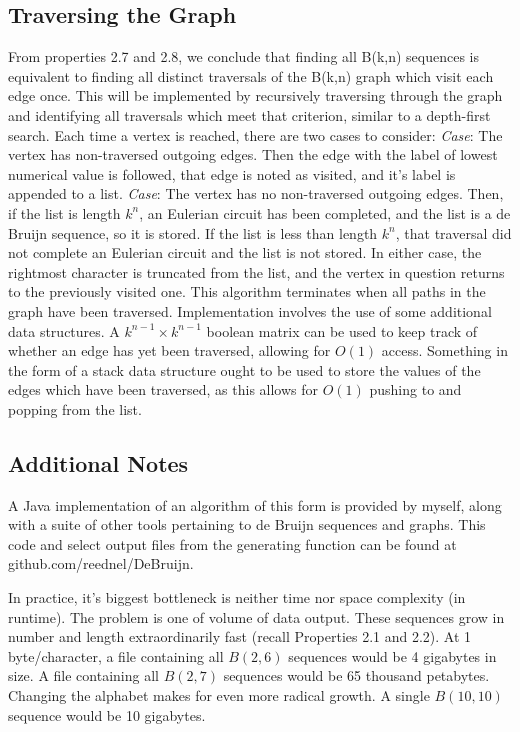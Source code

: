 \documentclass[12pt]{article}
\begin{document}
\subsection{Traversing the Graph}
From properties 2.7 and 2.8, we conclude that finding all B(k,n) sequences is equivalent to finding all distinct traversals of the B(k,n) graph which visit each edge once. This will be implemented by recursively traversing through the graph and identifying all traversals which meet that criterion, similar to a depth-first search. Each time a vertex is reached, there are two cases to consider:\newline
\emph{Case}: The vertex has non-traversed outgoing edges.\newline
Then the edge with the label of lowest numerical value is followed, that edge is noted as visited, and it's label is appended to a list.\newline
\emph{Case}: The vertex has no non-traversed outgoing edges.\newline
Then, if the list is length $k^{n}$, an Eulerian circuit has been completed, and the list is a de Bruijn sequence, so it is stored. If the list is less than length $k^{n}$, that traversal did not complete an Eulerian circuit and the list is not stored. In either case, the rightmost character is truncated from the list, and the vertex in question returns to the previously visited one.\newline
\indent This algorithm terminates when all paths in the graph have been traversed. Implementation involves the use of some additional data structures. A $k^{n-1} \times k^{n-1}$ boolean matrix can be used to keep track of whether an edge has yet been traversed, allowing for $O(1)$ access. Something in the form of a stack data structure ought to be used to store the values of the edges which have been traversed, as this allows for $O(1)$ pushing to and popping from the list. 

\subsection{Additional Notes}
A Java implementation of an algorithm of this form is provided by myself, along with a suite of other tools pertaining to de Bruijn sequences and graphs. This code and select output files from the generating function can be found at github.com/reednel/DeBruijn. \par
In practice, it’s biggest bottleneck is neither time nor space complexity (in runtime). The problem is one of volume of data output. These sequences grow in number and length extraordinarily fast (recall Properties 2.1 and 2.2). At 1 byte/character, a file containing all $B(2,6)$ sequences would be 4 gigabytes in size. A file containing all $B(2,7)$ sequences would be 65 thousand petabytes. Changing the alphabet makes for even more radical growth. A single $B(10,10)$ sequence would be 10 gigabytes. 
\end{document}
